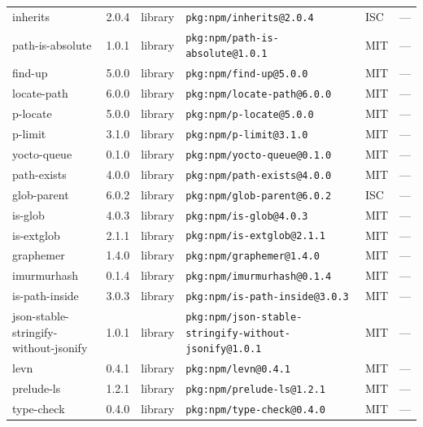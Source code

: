 \documentclass[11pt,a4paper]{article}
\begin{document}
\begin{longtable}{|p{4cm}|p{2cm}|p{1.6cm}|p{5cm}|p{1.5cm}|p{3.5cm}|}
\raggedright inherits & 2.0.4 & library & \small\texttt{pkg:npm/inherits@2.0.4} & ISC & \small — \\
\raggedright path-is-absolute & 1.0.1 & library & \small\texttt{pkg:npm/path-is-absolute@1.0.1} & MIT & \small — \\
\raggedright find-up & 5.0.0 & library & \small\texttt{pkg:npm/find-up@5.0.0} & MIT & \small — \\
\raggedright locate-path & 6.0.0 & library & \small\texttt{pkg:npm/locate-path@6.0.0} & MIT & \small — \\
\raggedright p-locate & 5.0.0 & library & \small\texttt{pkg:npm/p-locate@5.0.0} & MIT & \small — \\
\raggedright p-limit & 3.1.0 & library & \small\texttt{pkg:npm/p-limit@3.1.0} & MIT & \small — \\
\raggedright yocto-queue & 0.1.0 & library & \small\texttt{pkg:npm/yocto-queue@0.1.0} & MIT & \small — \\
\raggedright path-exists & 4.0.0 & library & \small\texttt{pkg:npm/path-exists@4.0.0} & MIT & \small — \\
\raggedright glob-parent & 6.0.2 & library & \small\texttt{pkg:npm/glob-parent@6.0.2} & ISC & \small — \\
\raggedright is-glob & 4.0.3 & library & \small\texttt{pkg:npm/is-glob@4.0.3} & MIT & \small — \\
\raggedright is-extglob & 2.1.1 & library & \small\texttt{pkg:npm/is-extglob@2.1.1} & MIT & \small — \\
\raggedright graphemer & 1.4.0 & library & \small\texttt{pkg:npm/graphemer@1.4.0} & MIT & \small — \\
\raggedright imurmurhash & 0.1.4 & library & \small\texttt{pkg:npm/imurmurhash@0.1.4} & MIT & \small — \\
\raggedright is-path-inside & 3.0.3 & library & \small\texttt{pkg:npm/is-path-inside@3.0.3} & MIT & \small — \\
\raggedright json-stable-stringify-without-jsonify & 1.0.1 & library & \small\texttt{pkg:npm/json-stable-stringify-without-jsonify@1.0.1} & MIT & \small — \\
\raggedright levn & 0.4.1 & library & \small\texttt{pkg:npm/levn@0.4.1} & MIT & \small — \\
\raggedright prelude-ls & 1.2.1 & library & \small\texttt{pkg:npm/prelude-ls@1.2.1} & MIT & \small — \\
\raggedright type-check & 0.4.0 & library & \small\texttt{pkg:npm/type-check@0.4.0} & MIT & \small — \\

\end{longtable}
\end{document}
